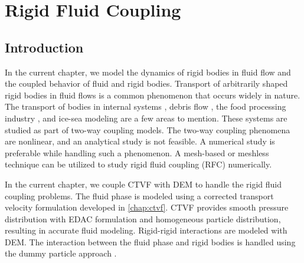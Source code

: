\chapter{Rigid Fluid Coupling}
\label{chap:rfc}

\section{Introduction}
\label{sec:rfc:intro}
In the current chapter, we model the dynamics of rigid bodies in fluid flow and
the coupled behavior of fluid and rigid bodies. Transport of arbitrarily shaped
rigid bodies in fluid flows is a common phenomenon that occurs widely in nature.
The transport of bodies in internal systems \citep{Dai2021}, debris flow
\citep{Qingyun2022}, the food processing industry \citep{Karunasena2014}, and
ice-sea modeling \citep{Mintu2018} are a few areas to mention. These systems are
studied as part of two-way coupling models. The two-way coupling phenomena are
nonlinear, and an analytical study is not feasible. A numerical study is
preferable while handling such a phenomenon. A mesh-based or meshless technique
can be utilized to study rigid fluid coupling (RFC) numerically.


In the current chapter, we couple CTVF with DEM to handle the rigid fluid
coupling problems. The fluid phase is modeled using a corrected transport
velocity formulation developed in \cref{chap:ctvf}. CTVF provides smooth
pressure distribution with EDAC formulation and homogeneous particle
distribution, resulting in accurate fluid modeling. Rigid-rigid interactions are
modeled with DEM. The interaction between the fluid phase and rigid bodies is
handled using the dummy particle approach \citep{Adami2012}.


\FloatBarrier%
